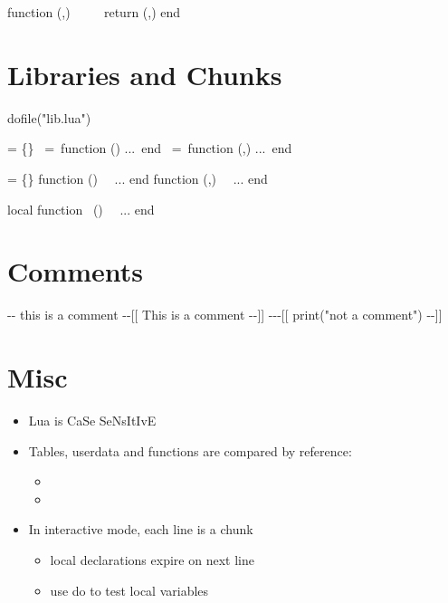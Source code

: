 \documentclass{refcard}
\newcommand{\X}{\I{x}}
\newcommand{\Y}{\I{y}}
\newcommand{\Z}{\I{z}}
\newcommand{\W}{\I{w}}
\newcommand{\F}{\I{f}}
\begin{document}
\begin{ldesc}
		function \F(\X,\Y) \li
		~~ \li
		~~return (\Z,\W) \li
		end
\end{ldesc}


\section{Libraries and Chunks}

\begin{ldesc}
	 dofile("lib.lua")

		 = \{\} \li
		~=~function (\X) ...~end \li
		~=~function (\X,\Y) ...~end

		 = \{\} \li
		function  (\X) \li
		~~... \li
		end \li
		function  (\X,\Y) \li
		~~... \li
		end

		local function \F~(\X) \li
		~~... \li
		end
\end{ldesc}



\section{Comments}

\begin{ldesc}
	  -{-} this is a comment
	   -{-}[[ \li
	                          This is a comment \li
	                          -{-}]]
	 -{-}-[[ \li
	                               print("not a comment") \li
	                               -{-}]]
\end{ldesc}


\section{Misc}

\begin{itemize}
	\item Lua is CaSe SeNsItIvE
	\item Tables, userdata and functions are compared by reference:
	\begin{itemize}
	      \item \C{~~~~~~~~~~~~~~~~\{\} ~\~{}=~ \{\}}
		  \item {}
	\end{itemize}
	\item In interactive mode, each line is a chunk
	\begin{itemize}
		\item local declarations expire on next line
		\item use do to test local variables
	\end{itemize}
\end{itemize}
\end{document}
